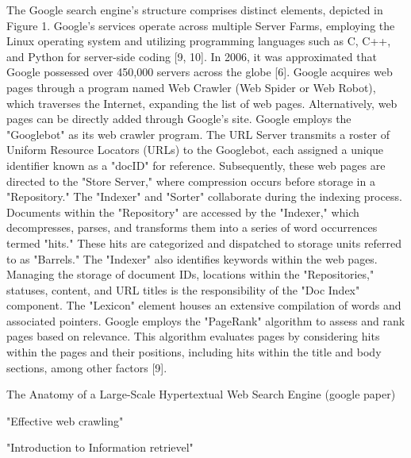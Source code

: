 The Google search engine's structure comprises distinct elements, depicted in Figure 1. Google's services operate across multiple Server Farms, employing the Linux operating system and utilizing programming languages such as C, C++, and Python for server-side coding [9, 10]. In 2006, it was approximated that Google possessed over 450,000 servers across the globe [6]. Google acquires web pages through a program named Web Crawler (Web Spider or Web Robot), which traverses the Internet, expanding the list of web pages. Alternatively, web pages can be directly added through Google's site. Google employs the "Googlebot" as its web crawler program. The URL Server transmits a roster of Uniform Resource Locators (URLs) to the Googlebot, each assigned a unique identifier known as a "docID" for reference. Subsequently, these web pages are directed to the "Store Server," where compression occurs before storage in a "Repository." The "Indexer" and "Sorter" collaborate during the indexing process. Documents within the "Repository" are accessed by the "Indexer," which decompresses, parses, and transforms them into a series of word occurrences termed "hits." These hits are categorized and dispatched to storage units referred to as "Barrels." The "Indexer" also identifies keywords within the web pages. Managing the storage of document IDs, locations within the "Repositories," statuses, content, and URL titles is the responsibility of the "Doc Index" component. The "Lexicon" element houses an extensive compilation of words and associated pointers. Google employs the "PageRank" algorithm to assess and rank pages based on relevance. This algorithm evaluates pages by considering hits within the pages and their positions, including hits within the title and body sections, among other factors [9].

The Anatomy of a Large-Scale Hypertextual Web Search Engine (google paper) 

"Effective web crawling"

"Introduction to Information retrievel"
